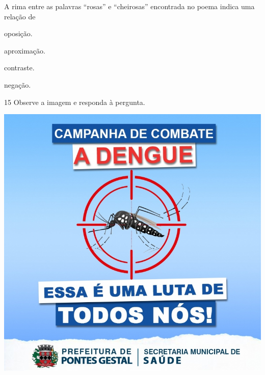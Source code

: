 \pagebreak
A rima entre as palavras ``rosas'' e ``cheirosas'' encontrada no poema indica uma relação de

\begin{escolha}
  \item oposição.

  \item aproximação.

  \item contraste.

  \item negação.
\end{escolha}

\num{15} Observe a imagem e responda à pergunta.

\begin{myquote}
\begin{center}
\includegraphics[width=\textwidth]{./imgQ4PORT/media/image3.jpeg}
\end{center}


\end{myquote}
